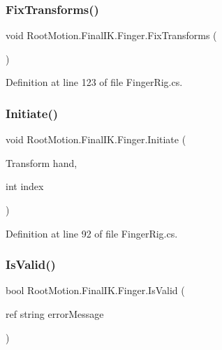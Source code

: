 \subsubsection{\texorpdfstring{Fix\+Transforms()}{FixTransforms()}}
{\footnotesize\ttfamily void Root\+Motion.\+Final\+I\+K.\+Finger.\+Fix\+Transforms (\begin{DoxyParamCaption}{ }\end{DoxyParamCaption})}



Definition at line 123 of file Finger\+Rig.\+cs.

\mbox{\label{class_root_motion_1_1_final_i_k_1_1_finger_a0ddbb8827ec12d4b95e422ef2680e68f}} 
\subsubsection{\texorpdfstring{Initiate()}{Initiate()}}
{\footnotesize\ttfamily void Root\+Motion.\+Final\+I\+K.\+Finger.\+Initiate (\begin{DoxyParamCaption}\item[{Transform}]{hand,  }\item[{int}]{index }\end{DoxyParamCaption})}



Definition at line 92 of file Finger\+Rig.\+cs.

\mbox{\label{class_root_motion_1_1_final_i_k_1_1_finger_ae9efb1adbdb73e37114b8cccfae88d9b}} 
\subsubsection{\texorpdfstring{Is\+Valid()}{IsValid()}}
{\footnotesize\ttfamily bool Root\+Motion.\+Final\+I\+K.\+Finger.\+Is\+Valid (\begin{DoxyParamCaption}\item[{ref string}]{error\+Message }\end{DoxyParamCaption})}




